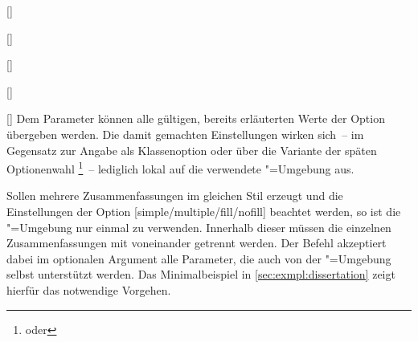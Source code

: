 \begin{Declaration}{[]}
\begin{Declaration}[v2.02]{}
\begin{Declaration}{[]}
\begin{Declaration}[v2.02]{%
  []%
}
\begin{Declaration}{[]}
\begin{Declaration}{[\PSet]}
Dem Parameter  können alle gültigen, 
bereits erläuterten Werte der Option  übergeben werden. 
Die damit gemachten Einstellungen wirken sich~-- im Gegensatz zur Angabe als 
Klassenoption oder über die Variante der späten Optionenwahl%
\footnote{%
   oder
}~-- lediglich lokal auf die verwendete "=Umgebung aus.

Sollen mehrere Zusammenfassungen im gleichen Stil erzeugt und die Einstellungen 
der Option [simple/multiple/fill/nofill] beachtet werden, so 
ist die "=Umgebung nur einmal zu verwenden. Innerhalb 
dieser müssen die einzelnen Zusammenfassungen mit  
voneinander getrennt werden. Der Befehl akzeptiert dabei im optionalen Argument 
alle Parameter, die auch von der "=Umgebung selbst 
unterstützt werden. Das Minimalbeispiel in \autoref{sec:exmpl:dissertation} 
zeigt hierfür das notwendige Vorgehen.
%
\end{Declaration}
\end{Declaration}
\end{Declaration}
\end{Declaration}
\end{Declaration}
\end{Declaration}
%


